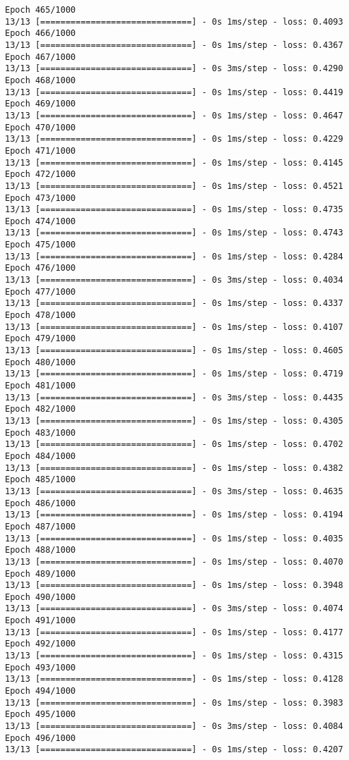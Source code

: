 \documentclass[11pt]{article}
\begin{document}
\begin{Verbatim}[commandchars=\\\{\}]
Epoch 465/1000
13/13 [==============================] - 0s 1ms/step - loss: 0.4093
Epoch 466/1000
13/13 [==============================] - 0s 1ms/step - loss: 0.4367
Epoch 467/1000
13/13 [==============================] - 0s 3ms/step - loss: 0.4290
Epoch 468/1000
13/13 [==============================] - 0s 1ms/step - loss: 0.4419
Epoch 469/1000
13/13 [==============================] - 0s 1ms/step - loss: 0.4647
Epoch 470/1000
13/13 [==============================] - 0s 1ms/step - loss: 0.4229
Epoch 471/1000
13/13 [==============================] - 0s 1ms/step - loss: 0.4145
Epoch 472/1000
13/13 [==============================] - 0s 1ms/step - loss: 0.4521
Epoch 473/1000
13/13 [==============================] - 0s 1ms/step - loss: 0.4735
Epoch 474/1000
13/13 [==============================] - 0s 1ms/step - loss: 0.4743
Epoch 475/1000
13/13 [==============================] - 0s 1ms/step - loss: 0.4284
Epoch 476/1000
13/13 [==============================] - 0s 3ms/step - loss: 0.4034
Epoch 477/1000
13/13 [==============================] - 0s 1ms/step - loss: 0.4337
Epoch 478/1000
13/13 [==============================] - 0s 1ms/step - loss: 0.4107
Epoch 479/1000
13/13 [==============================] - 0s 1ms/step - loss: 0.4605
Epoch 480/1000
13/13 [==============================] - 0s 1ms/step - loss: 0.4719
Epoch 481/1000
13/13 [==============================] - 0s 3ms/step - loss: 0.4435
Epoch 482/1000
13/13 [==============================] - 0s 1ms/step - loss: 0.4305
Epoch 483/1000
13/13 [==============================] - 0s 1ms/step - loss: 0.4702
Epoch 484/1000
13/13 [==============================] - 0s 1ms/step - loss: 0.4382
Epoch 485/1000
13/13 [==============================] - 0s 3ms/step - loss: 0.4635
Epoch 486/1000
13/13 [==============================] - 0s 1ms/step - loss: 0.4194
Epoch 487/1000
13/13 [==============================] - 0s 1ms/step - loss: 0.4035
Epoch 488/1000
13/13 [==============================] - 0s 1ms/step - loss: 0.4070
Epoch 489/1000
13/13 [==============================] - 0s 1ms/step - loss: 0.3948
Epoch 490/1000
13/13 [==============================] - 0s 3ms/step - loss: 0.4074
Epoch 491/1000
13/13 [==============================] - 0s 1ms/step - loss: 0.4177
Epoch 492/1000
13/13 [==============================] - 0s 1ms/step - loss: 0.4315
Epoch 493/1000
13/13 [==============================] - 0s 1ms/step - loss: 0.4128
Epoch 494/1000
13/13 [==============================] - 0s 1ms/step - loss: 0.3983
Epoch 495/1000
13/13 [==============================] - 0s 3ms/step - loss: 0.4084
Epoch 496/1000
13/13 [==============================] - 0s 1ms/step - loss: 0.4207

\end{Verbatim}
\end{document}
